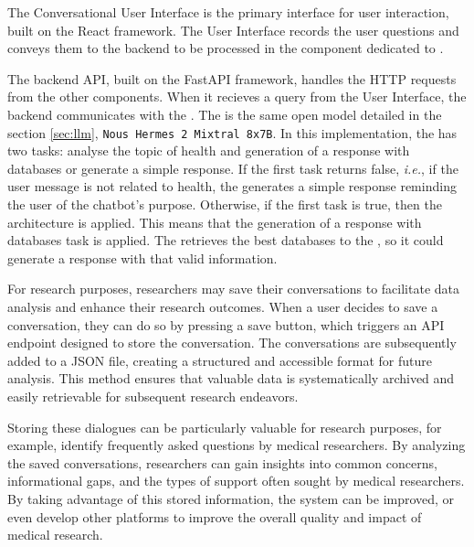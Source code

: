 The Conversational User Interface is the primary interface for user interaction, built on the React framework. The User Interface records the user questions and conveys them to the backend to be processed in the component dedicated to {\ir}. 

The backend API, built on the FastAPI framework, handles the HTTP requests from the other components. When it recieves a query from the User Interface, the backend communicates with the {\llm}. The {\llm} is the same open model detailed in the section \ref{sec:llm}, \texttt{Nous Hermes 2 Mixtral 8x7B}. In this implementation, the {\llm} has two tasks: analyse the topic of health and generation of a response with databases or generate a simple response. If the first task returns false, \textit{i.e.}, if the user message is not related to health, the {\llm} generates a simple response reminding the user of the chatbot's purpose. Otherwise, if the first task is true, then the {\rag} architecture is applied. This means that the generation of a response with databases task is applied. The {\bm} retrieves the best databases to the {\llm}, so it could generate a response with that valid information.

For research purposes, researchers may save their conversations to facilitate data analysis and enhance their research outcomes. When a user decides to save a conversation, they can do so by pressing a save button, which triggers an API endpoint designed to store the conversation. The conversations are subsequently added to a JSON file, creating a structured and accessible format for future analysis. This method ensures that valuable data is systematically archived and easily retrievable for subsequent research endeavors.

Storing these dialogues can be particularly valuable for research purposes, for example, identify frequently asked questions by medical researchers. By analyzing the saved conversations, researchers can gain insights into common concerns, informational gaps, and the types of support often sought by medical researchers. By taking advantage of this stored information, the system can be improved, or even develop other platforms to improve the overall quality and impact of medical research.